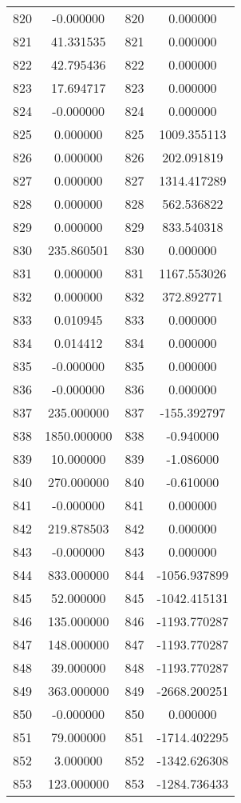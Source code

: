 \documentclass[12pt]{article}
\begin{document}
\begin{longtable}{@{}cccc@{}}
820 & -0.000000 & 820 & 0.000000 \\
821 & 41.331535 & 821 & 0.000000 \\
822 & 42.795436 & 822 & 0.000000 \\
823 & 17.694717 & 823 & 0.000000 \\
824 & -0.000000 & 824 & 0.000000 \\
825 & 0.000000 & 825 & 1009.355113 \\
826 & 0.000000 & 826 & 202.091819 \\
827 & 0.000000 & 827 & 1314.417289 \\
828 & 0.000000 & 828 & 562.536822 \\
829 & 0.000000 & 829 & 833.540318 \\
830 & 235.860501 & 830 & 0.000000 \\
831 & 0.000000 & 831 & 1167.553026 \\
832 & 0.000000 & 832 & 372.892771 \\
833 & 0.010945 & 833 & 0.000000 \\
834 & 0.014412 & 834 & 0.000000 \\
835 & -0.000000 & 835 & 0.000000 \\
836 & -0.000000 & 836 & 0.000000 \\
837 & 235.000000 & 837 & -155.392797 \\
838 & 1850.000000 & 838 & -0.940000 \\
839 & 10.000000 & 839 & -1.086000 \\
840 & 270.000000 & 840 & -0.610000 \\
841 & -0.000000 & 841 & 0.000000 \\
842 & 219.878503 & 842 & 0.000000 \\
843 & -0.000000 & 843 & 0.000000 \\
844 & 833.000000 & 844 & -1056.937899 \\
845 & 52.000000 & 845 & -1042.415131 \\
846 & 135.000000 & 846 & -1193.770287 \\
847 & 148.000000 & 847 & -1193.770287 \\
848 & 39.000000 & 848 & -1193.770287 \\
849 & 363.000000 & 849 & -2668.200251 \\
850 & -0.000000 & 850 & 0.000000 \\
851 & 79.000000 & 851 & -1714.402295 \\
852 & 3.000000 & 852 & -1342.626308 \\
853 & 123.000000 & 853 & -1284.736433 \\

\end{longtable}
\end{document}

